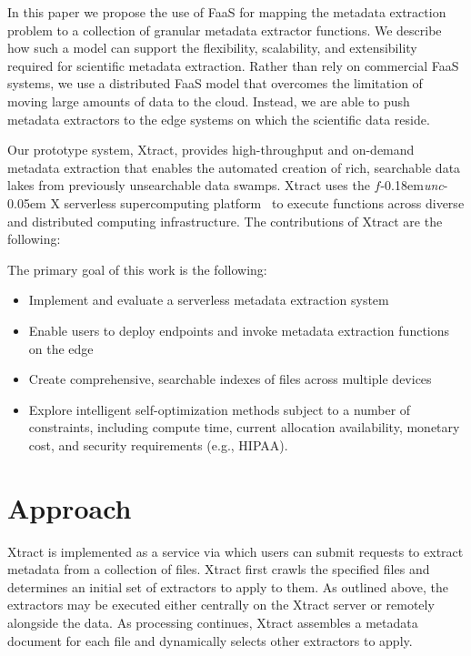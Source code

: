 \documentclass[sigconf]{acmart}
\newcommand{\name}{Xtract}
\newcommand{\funcx}{$f$\kern-0.18em\emph{unc}\kern-0.05em X}
\begin{document}
In this paper we propose the use of FaaS for mapping the metadata extraction problem to a 
collection of granular metadata extractor functions. 
We describe how such a model can support the flexibility, scalability, and extensibility required
for scientific metadata extraction. 
Rather than rely on commercial FaaS systems, we use a distributed FaaS model 
that overcomes the limitation of moving large amounts of data to the cloud. 
Instead, we are able to push
metadata extractors to the edge systems on which the scientific data reside. 

Our prototype system, \name{}, provides high-throughput and on-demand metadata 
extraction that enables the automated creation of rich, searchable data lakes from previously unsearchable data swamps. 
\name{} uses the \funcx{} serverless supercomputing platform~\cite{chard2019serverless}
to execute functions across diverse and distributed computing infrastructure.
The contributions of \name{} are the following: 



The primary goal of this work is the following: 

\begin{itemize}
\item Implement and evaluate a serverless metadata extraction system
\item Enable users to deploy endpoints and invoke metadata extraction functions on the edge
\item Create comprehensive, searchable indexes of files across multiple devices
\item Explore intelligent self-optimization methods subject to a number of constraints, including compute time, 
current allocation availability, monetary cost, and security requirements (e.g., HIPAA).
\end{itemize}


\section{Approach}
\label{sec:approach}

\name{} is implemented as a service via which users can submit
requests to extract metadata from a collection of files.
\name{} first crawls the specified files and determines
an initial set of extractors to apply to them. 
As outlined above, the extractors may be executed
either centrally on the \name{} server or remotely alongside
the data. As processing continues, \name{} assembles 
a metadata document for each file and dynamically selects
other extractors to apply.
\end{document}
